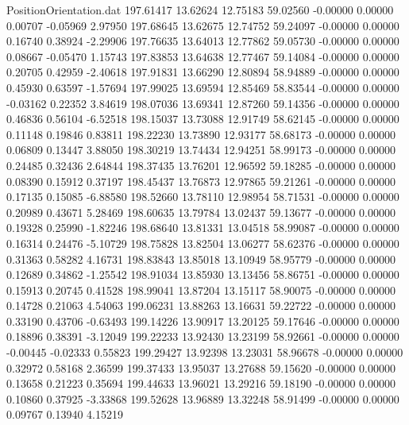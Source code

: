 \begin{filecontents}{PositionOrientation.dat}
 197.61417   13.62624   12.75183    59.02560   -0.00000    0.00000    0.00707   -0.05969    2.97950
 197.68645   13.62675   12.74752    59.24097   -0.00000    0.00000    0.16740    0.38924   -2.29906
 197.76635   13.64013   12.77862    59.05730   -0.00000    0.00000    0.08667   -0.05470    1.15743
 197.83853   13.64638   12.77467    59.14084   -0.00000    0.00000    0.20705    0.42959   -2.40618
 197.91831   13.66290   12.80894    58.94889   -0.00000    0.00000    0.45930    0.63597   -1.57694
 197.99025   13.69594   12.85469    58.83544   -0.00000    0.00000   -0.03162    0.22352    3.84619
 198.07036   13.69341   12.87260    59.14356   -0.00000    0.00000    0.46836    0.56104   -6.52518
 198.15037   13.73088   12.91749    58.62145   -0.00000    0.00000    0.11148    0.19846    0.83811
 198.22230   13.73890   12.93177    58.68173   -0.00000    0.00000    0.06809    0.13447    3.88050
 198.30219   13.74434   12.94251    58.99173   -0.00000    0.00000    0.24485    0.32436    2.64844
 198.37435   13.76201   12.96592    59.18285   -0.00000    0.00000    0.08390    0.15912    0.37197
 198.45437   13.76873   12.97865    59.21261   -0.00000    0.00000    0.17135    0.15085   -6.88580
 198.52660   13.78110   12.98954    58.71531   -0.00000    0.00000    0.20989    0.43671    5.28469
 198.60635   13.79784   13.02437    59.13677   -0.00000    0.00000    0.19328    0.25990   -1.82246
 198.68640   13.81331   13.04518    58.99087   -0.00000    0.00000    0.16314    0.24476   -5.10729
 198.75828   13.82504   13.06277    58.62376   -0.00000    0.00000    0.31363    0.58282    4.16731
 198.83843   13.85018   13.10949    58.95779   -0.00000    0.00000    0.12689    0.34862   -1.25542
 198.91034   13.85930   13.13456    58.86751   -0.00000    0.00000    0.15913    0.20745    0.41528
 198.99041   13.87204   13.15117    58.90075   -0.00000    0.00000    0.14728    0.21063    4.54063
 199.06231   13.88263   13.16631    59.22722   -0.00000    0.00000    0.33190    0.43706   -0.63493
 199.14226   13.90917   13.20125    59.17646   -0.00000    0.00000    0.18896    0.38391   -3.12049
 199.22233   13.92430   13.23199    58.92661   -0.00000    0.00000   -0.00445   -0.02333    0.55823
 199.29427   13.92398   13.23031    58.96678   -0.00000    0.00000    0.32972    0.58168    2.36599
 199.37433   13.95037   13.27688    59.15620   -0.00000    0.00000    0.13658    0.21223    0.35694
 199.44633   13.96021   13.29216    59.18190   -0.00000    0.00000    0.10860    0.37925   -3.33868
 199.52628   13.96889   13.32248    58.91499   -0.00000    0.00000    0.09767    0.13940    4.15219

\end{filecontents}
